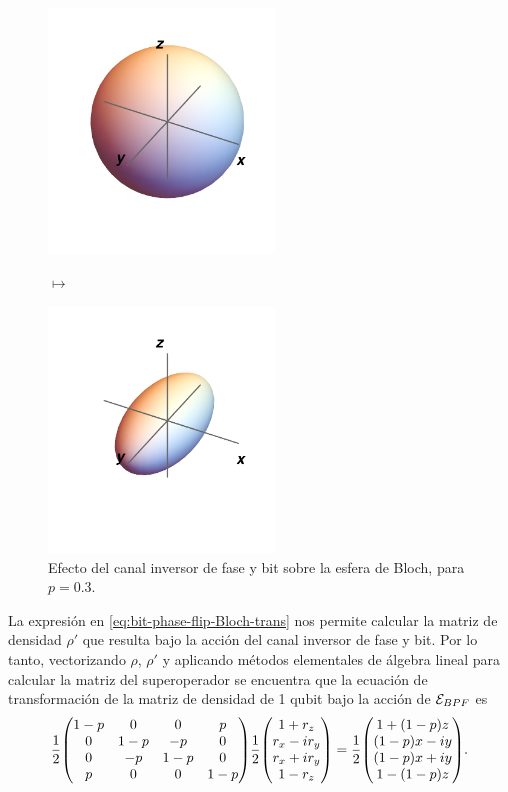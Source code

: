 \begin{figure}[H]
\centering
\begin{minipage}{.4\textwidth}
    \centering
    \includegraphics[width=6cm]{images/bloch-ball}
\end{minipage}
$\longmapsto$
\begin{minipage}{0.4\textwidth}
    \centering
    \includegraphics[width=6cm]{images/bit-phase-flip}
\end{minipage}
\caption{Efecto del canal inversor de fase y bit sobre la esfera de Bloch, 
para $p=0.3$.}
\label{fig:bit-phase-flip}
\end{figure}
La expresión en \eqref{eq:bit-phase-flip-Bloch-trans} nos 
permite calcular la matriz de densidad $\rho'$ que resulta
bajo la acción del canal inversor de fase y bit. Por lo tanto, 
vectorizando $\rho$, $\rho'$ y aplicando métodos elementales de
álgebra lineal para calcular la matriz del superoperador
se encuentra que la ecuación de transformación de
la matriz de densidad de 1 qubit bajo la acción 
de $\mathcal{E}_{BPF}$ es
\begin{align}
\frac{1}{2}
\mqty(
1-p & 0 & 0 & p \\
0 & 1-p & -p & 0 \\
0 & -p & 1-p & 0 \\
p & 0 & 0 & 1-p \\
)
\frac{1}{2}
\mqty(
1+r_z\\r_x-ir_y\\r_x+ir_y\\1-r_z
)
=
\frac{1}{2}
\mqty(
1+\qty(1-p)z\\
\qty(1-p)x-i y\\
\qty(1-p)x+i y\\
1-\qty(1-p)z
).
\label{eq:bpf-supero}
\end{align}
